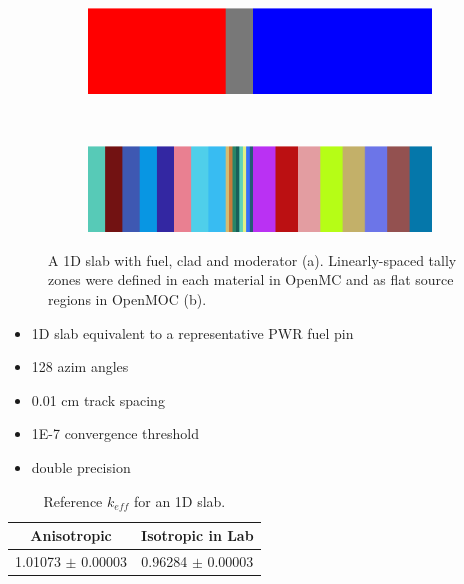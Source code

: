 \begin{figure}[h!]
\begin{subfigure}{\textwidth}
  \centering
  \includegraphics[width=\linewidth]{figures/biases/slab/slab-simple}
  \caption{}
\end{subfigure} \\
\begin{subfigure}{\textwidth}
  \centering
  \includegraphics[width=\linewidth]{figures/biases/slab/slab-8x}
  \caption{}
\end{subfigure}
\caption[1D slab materials and geometry]{A 1D slab with fuel, clad and moderator (a). Linearly-spaced tally zones were defined in each material in OpenMC and as flat source regions in OpenMOC (b).}
\label{fig:chap4-slab}
\end{figure}

\begin{itemize}[noitemsep]
  \item 1D slab equivalent to a representative \ac{PWR} fuel pin
  \item 128 azim angles
  \item 0.01 cm track spacing
  \item 1E-7 convergence threshold
  \item double precision
\end{itemize}

\begin{table}[h!]
  \centering
  \caption{Reference $k_{eff}$ for an 1D slab.}
  \label{table:chap2-slab-reference} 
  \vspace{14pt}
  \begin{tabular}{c c}
  \toprule
  \multicolumn{1}{c}{\bf Anisotropic} &
  \multicolumn{1}{c}{\bf Isotropic in Lab} \\
  \midrule
  1.01073 $\pm$ 0.00003 & 0.96284 $\pm$ 0.00003 \\
  \bottomrule
\end{tabular}
\end{table}

